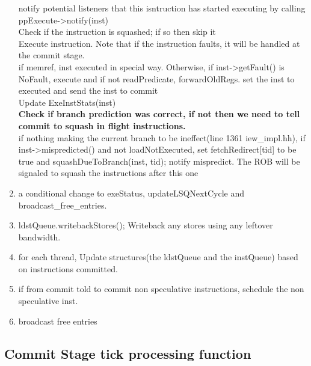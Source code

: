 \documentclass[11pt]{article}
\begin{document}
\begin{enumerate}
	notify potential listeners that this isntruction has started executing by calling ppExecute-\textgreater notify(inst)\\
	
	Check if the instruction is squashed; if so then skip it\\
	
	Execute instruction. Note that if the instruction faults, it will be handled at the commit stage.\\
	
	if memref, inst executed in special way. Otherwise, if inst-\textgreater getFault() is NoFault, execute and if not readPredicate, forwardOldRegs. set the inst to executed and send the inst to commit\\
	
	Update ExeInstStats(inst)\\
	
	\textbf{Check if branch prediction was correct, if not then we need to tell commit to squash in flight instructions.}\\
	
	if nothing making the current branch to be ineffect(line 1361 iew\_impl.hh), if inst-\textgreater mispredicted() and not loadNotExecuted, set fetchRedirect[tid] to be true and squashDueToBranch(inst, tid); notify mispredict. The ROB will be signaled to squash the instructions after this one
	
	\item  a conditional change to exeStatus, updateLSQNextCycle and broadcast\_free\_entries.\\
	
	\item ldstQueue.writebackStores(); Writeback any stores using any leftover bandwidth.
	
	\item for each thread, Update structures(the ldstQueue and the instQueue) based on instructions committed.
	
	\item if from commit told to commit non speculative instructions, schedule the non speculative inst.
	
	
	\item broadcast free entries

\end{enumerate}

\subsection{Commit Stage tick processing function\\}
\end{document}
